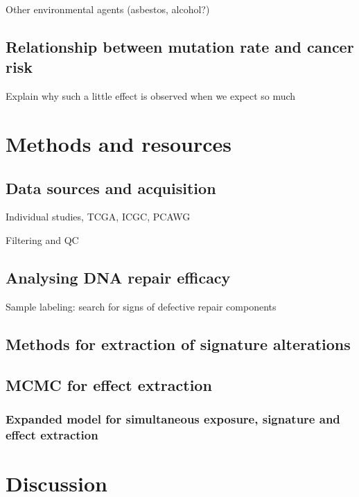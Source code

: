 Other environmental agents (asbestos, alcohol?)

\subsection{Relationship between mutation rate and cancer risk}

Explain why such a little effect is observed when we expect so much


\section{Methods and resources}

\subsection{Data sources and acquisition}

Individual studies, TCGA, ICGC, PCAWG

Filtering and QC

\subsection{Analysing DNA repair efficacy}

Sample labeling: search for signs of defective repair components

\subsection{Methods for extraction of signature alterations}

\subsection*{MCMC for effect extraction}

\subsubsection*{Expanded model for simultaneous exposure, signature and effect extraction}



\section{Discussion}

